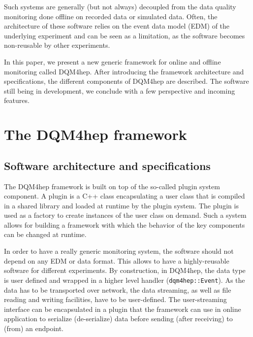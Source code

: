\documentclass{webofc}
\begin{document}
Such systems are generally (but not always) decoupled from the data quality monitoring done offline on recorded data or simulated data.
Often, the architecture of these software relies on the event data model (EDM) of the underlying experiment and 
can be seen as a limitation, as the software becomes non-reusable by other experiments.

In this paper, we present a new generic framework for online and offline monitoring called DQM4hep. 
After introducing the framework architecture and specifications, the different components of DQM4hep are described. 
The software still being in development, we conclude with a few perspective and incoming features.

\section{The DQM4hep framework}
\label{sec:framework}

\subsection{Software architecture and specifications}
\label{subsec:arch}

The DQM4hep framework is built on top of the so-called plugin system component. 
A plugin is a C++ class encapsulating a user class that is compiled in a shared library and loaded at runtime by the plugin system. 
The plugin is used as a factory to create instances of the user class on demand.
Such a system allows for building a framework with which the behavior of the key components can be changed at runtime. 

In order to have a really generic monitoring system, the software should not depend on any EDM or data format. 
This allows to have a highly-reusable software for different experiments. 
By construction, in DQM4hep, the data type is user defined and wrapped in a higher level handler (\texttt{dqm4hep::Event}). 
As the data has to be transported over network, the data streaming, as well as file reading and writing facilities, have to be user-defined.
The user-streaming interface can be encapsulated in a plugin that the framework can use in online application to serialize (de-serialize) data before sending (after receiving) to (from) an endpoint.
\end{document}
